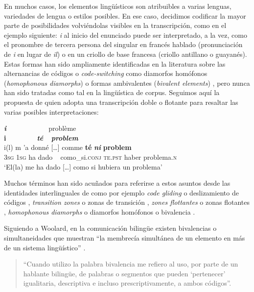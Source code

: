 \documentclass[output=paper]{langscibook}
\begin{document}
En muchos casos, los elementos lingüísticos son atribuibles a varias lenguas, variedades de lengua o estilos posibles. En ese caso, decidimos codificar la mayor parte de posibilidades volviéndolas visibles en la transcripción, como en el ejemplo siguiente: \textit{i} al inicio del enunciado puede ser interpretado, a la vez, como el pronombre de tercera persona del singular en francés hablado (pronunciación de \textit{i} en lugar de \textit{il}) o en un criollo de base francesa (criollo antillano o guayanés). Estas formas han sido ampliamente identificadas en la literatura sobre las alternancias de códigos o \textit{code-switching} como diamorfos homófonos (\textit {homophonous diamorphs}) \citep{Muysken1990} o formas ambivalentes (\textit {bivalent elements}) \citep{Woolard1998}, pero nunca han sido tratadas como tal en la lingüística de corpus. Seguimos aquí la propuesta de  \citet{Ledegen2012} quien adopta una transcripción doble o flotante para resaltar las varias posibles interpretaciones:


\ea\label{ex:leglise:1}
\gllll \textbf{\textit{i}}   ~            ~  ~      ~   ~                     ~               ~          problème\\
       \textbf{i}   ~            ~  ~      ~   ~                     \textbf{\textit{té}}     ~          \textbf{\textit{problem}}\\
       i(l)        m ’a  donné  […] comme    \textbf{té}    \textbf{\textit{ni}}  \textbf{problem}\\
       3\textsc{sg} 1\textsc{sg} ha dado   ~   como\_si.\textsc{conj} \textsc{te.pst} haber problema.\textsc{n}\\
\glt `El(la) me ha dado […]  como si hubiera un problema'
\z

Muchos términos han sido acuñados para referirse a estos asuntos desde las identidades interlinguales de \citet{Haugen1972} como por ejemplo \textit{code gliding} o deslizamiento de códigos \citep{Baggioni1992}, \textit{transition zones} o zonas de transición \citep{Franceschini1998}, \textit{zones flottantes} o zonas flotantes \citep{Ledegen2012}, \textit{homophonous diamorphs} o diamorfos homófonos \citep{Muysken1990} o bivalencia \citep{Woolard1998}.

Siguiendo a Woolard, en la comunicación bilingüe existen bivalencias o simultaneidades que muestran “la membrecía simultánea de un elemento en más de un sistema lingüístico” \citep[6]{Woolard1998}. 


\begin{quote}
“Cuando utilizo la palabra bivalencia me refiero al uso, por parte de un hablante bilingüe, de palabras o segmentos que pueden ‘pertenecer’ igualitaria, descriptiva e incluso prescriptivamente, a ambos códigos”. \citep[7]{Woolard1998}
\end{quote}
\end{document}
